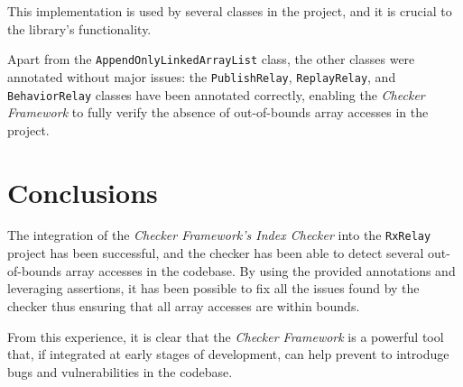 \documentclass[a4paper, 11pt]{article}
\begin{document}
This implementation is used by several classes in the project, and it is crucial to the library's functionality.

\pagebreak

\noindent Apart from the \texttt{AppendOnlyLinkedArrayList} class, the other classes were annotated without major issues: the \texttt{PublishRelay}, \texttt{ReplayRelay}, and \texttt{BehaviorRelay} classes have been annotated correctly, enabling the \textit{Checker Framework} to fully verify the absence of out-of-bounds array accesses in the project.

\section{Conclusions}

The integration of the \textit{Checker Framework's Index Checker} into the \texttt{RxRelay} project has been successful, and the checker has been able to detect several out-of-bounds array accesses in the codebase. By using the provided annotations and leveraging assertions, it has been possible to fix all the issues found by the checker thus ensuring that all array accesses are within bounds.

From this experience, it is clear that the \textit{Checker Framework} is a powerful tool that, if integrated at early stages of development, can help prevent to introduge bugs and vulnerabilities in the codebase.

\vfill

\nocite{*} %

\end{document}
